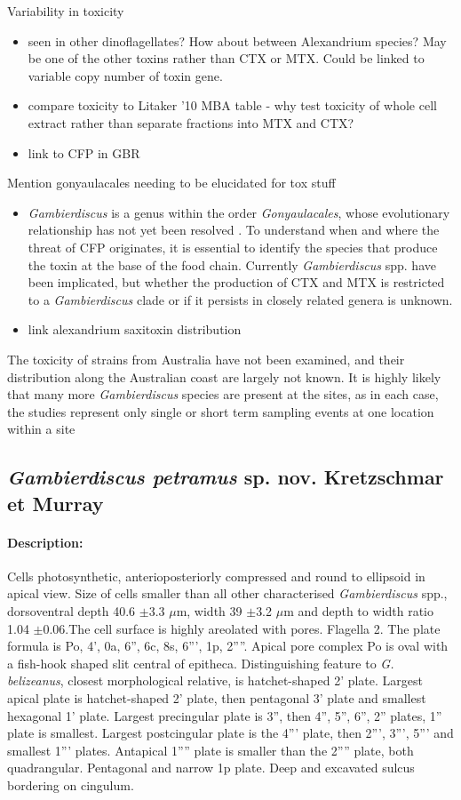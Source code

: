 \documentclass[12pt]{article}
\begin{document}
Variability in toxicity 
\begin{itemize}
\item seen in other dinoflagellates? How about between Alexandrium species? May be one of the other toxins  rather than CTX or MTX. Could be linked to variable copy number of toxin gene.
\item compare toxicity to Litaker '10 MBA table - why test toxicity of whole cell extract rather than separate fractions into MTX and CTX?
\item link to CFP in GBR
\end{itemize}

Mention gonyaulacales needing to be elucidated for tox stuff 
\begin{itemize}
\item \emph{Gambierdiscus} is a genus within the order \emph{Gonyaulacales}, whose evolutionary relationship has not yet been resolved \cite{gentekaki2014large}. To understand when and where the threat of CFP originates, it is essential to identify the species that produce the toxin at the base of the food chain. Currently \emph{Gambierdiscus} spp. have been implicated, but whether the production of CTX and MTX is restricted to a \emph{Gambierdiscus} clade or if it  persists in closely related genera is unknown.
\item link alexandrium saxitoxin distribution
\end{itemize}


 The toxicity of strains from Australia have not been examined, and their distribution along the Australian coast are largely not known. It is highly likely that many more \emph{Gambierdiscus} species are present at the sites, as in each case, the studies represent only single or short term sampling events at one location within a site
 \newline
 \subsection{\emph{Gambierdiscus petramus} sp. nov. Kretzschmar et Murray}
 \paragraph{Description:} Cells photosynthetic, anterioposteriorly compressed and round to ellipsoid in apical view. Size of cells smaller than all other characterised \emph{Gambierdiscus} spp., dorsoventral depth 40.6 $\pm$3.3 $\mu$m, width 39 $\pm$3.2 $\mu$m and depth to width ratio 1.04 $\pm$0.06.The cell surface is highly areolated with pores. Flagella 2. The plate formula is Po, 4', 0a, 6'', 6c, 8s, 6''', 1p, 2''''. 
Apical pore complex Po is oval with a fish-hook shaped slit central of epitheca. Distinguishing feature to \emph{G. belizeanus}, closest morphological relative, is hatchet-shaped 2' plate. Largest apical plate is hatchet-shaped 2' plate, then pentagonal 3' plate and smallest hexagonal 1' plate. Largest precingular plate is 3'', then 4'', 5'', 6'', 2'' plates, 1'' plate is smallest. Largest postcingular plate is the 4''' plate, then 2''', 3''', 5''' and smallest 1''' plates. Antapical 1'''' plate is smaller than the 2'''' plate, both quadrangular. Pentagonal and narrow 1p plate. Deep and excavated sulcus bordering on cingulum.
\end{document}
